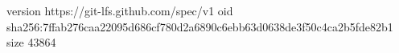 version https://git-lfs.github.com/spec/v1
oid sha256:7ffab276caa22095d686cf780d2a6890c6ebb63d0638de3f50c4ca2b5fde82b1
size 43864

